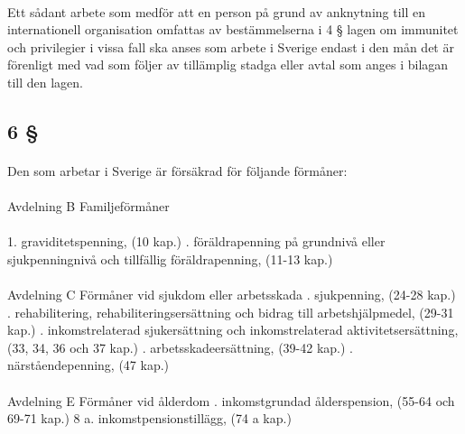 \documentclass[a4paper,notitlepage,openany,10pt]{book}
\begin{document}
\paragraph*{}
Ett sådant arbete som medför att en person på grund av anknytning till en internationell organisation omfattas av bestämmelserna i 4 § lagen om immunitet och privilegier i vissa fall ska anses som arbete i Sverige endast i den mån det är förenligt med vad som följer av tillämplig stadga eller avtal som anges i bilagan till den lagen.
\subsection*{6 §}
\paragraph*{}
Den som arbetar i Sverige är försäkrad för följande förmåner:
\paragraph*{}
Avdelning B Familjeförmåner
\paragraph*{}
1. graviditetspenning, (10 kap.)
. föräldrapenning på grundnivå eller sjukpenningnivå och
tillfällig föräldrapenning, (11-13 kap.)
\paragraph*{}
Avdelning C Förmåner vid sjukdom eller arbetsskada
. sjukpenning, (24-28 kap.)
. rehabilitering, rehabiliteringsersättning och
bidrag till arbetshjälpmedel, (29-31 kap.)
. inkomstrelaterad sjukersättning och inkomstrelaterad
aktivitetsersättning, (33, 34, 36 och 37 kap.)
. arbetsskadeersättning, (39-42 kap.)
. närståendepenning, (47 kap.)
\paragraph*{}
Avdelning E Förmåner vid ålderdom
. inkomstgrundad ålderspension, (55-64 och 69-71 kap.)
8 a. inkomstpensionstillägg, (74 a kap.)
\end{document}
